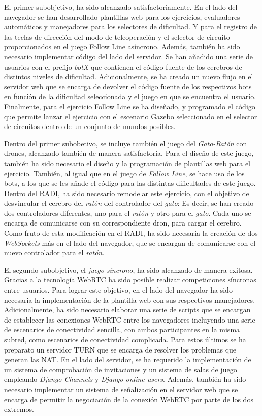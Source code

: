 \documentclass[a4paper, 12pt]{book}
\begin{document}
El primer subobjetivo, ha sido alcanzado satisfactoriamente. En el lado del navegador se han desarrollado plantillas web para los ejercicios, evaluadores automáticos y manejadores para los selectores de dificultad. Y para el registro de las teclas de dirección del modo de teleoperación y el selector de circuito proporcionados en el juego Follow Line asíncrono. Además, también ha sido necesario implementar código del lado del servidor. Se han añadido una serie de usuarios con el prefijo \emph{botX} que contienen el código fuente de los cerebros de distintos niveles de dificultad. Adicionalmente, se ha creado un nuevo flujo en el servidor web que se encarga de devolver el código fuente de los respectivos bots en función de la dificultad seleccionada y el juego en que se encuentra el usuario. Finalmente, para el ejercicio Follow Line se ha diseñado, y programado el código que permite lanzar el ejercicio con el escenario Gazebo seleccionado en el selector de circuitos dentro de un conjunto de mundos posibles.

Dentro del primer subobetivo, se incluye también el juego del \emph{Gato-Ratón} con drones, alcanzado también de manera satisfactoria. Para el diseño de este juego, también ha sido necesario el diseño y la programación de plantillas web para el ejercicio. También, al igual que en el juego de \emph{Follow Line}, se hace uso de los bots, a los que se les añade el código para las distintas dificultades de este juego. Dentro del RADI, ha sido necesario remodelar este ejercicio, con el objetivo de desvincular el cerebro del \emph{ratón} del controlador del \emph{gato}: Es decir, se han creado dos controladores diferentes, uno para el \emph{ratón} y otro para el \emph{gato}. Cada uno se encarga de comunicarse con su correspondiente dron, para cargar el cerebro. Como fruto de esta modificación en el RADI, ha sido necesaria la creación de dos \emph{WebSockets} más en el lado del navegador, que se encargan de comunicarse con el nuevo controlador para el \emph{ratón}.

El segundo subobjetivo, el \emph{juego síncrono}, ha sido alcanzado de manera exitosa. Gracias a la tecnología WebRTC ha sido posible realizar competiciones síncronas entre usuarios. Para lograr este objetivo, en el lado del navegador ha sido necesaria la implementación de la plantilla web con sus respectivos manejadores. Adicionalmente, ha sido necesario elaborar una serie de scripts que se encargan de establecer las conexiones WebRTC entre los navegadores incluyendo una serie de escenarios de conectividad sencilla, con ambos participantes en la misma subred, como escenarios de conectividad complicada. Para estos últimos se ha preparato un servidor TURN que se encarga de resolver los problemas que generan las NAT. En el lado del servidor, se ha requerido la implementación de un sistema de comprobación de invitaciones y un sistema de salas de juego empleando \emph{Django-Channels} y \emph{Django-online-users}. Además, también ha sido necesario implementar un sistema de señalización en el servidor web que se encarga de permitir la negociación de la conexión WebRTC por parte de los dos extremos.
\end{document}
